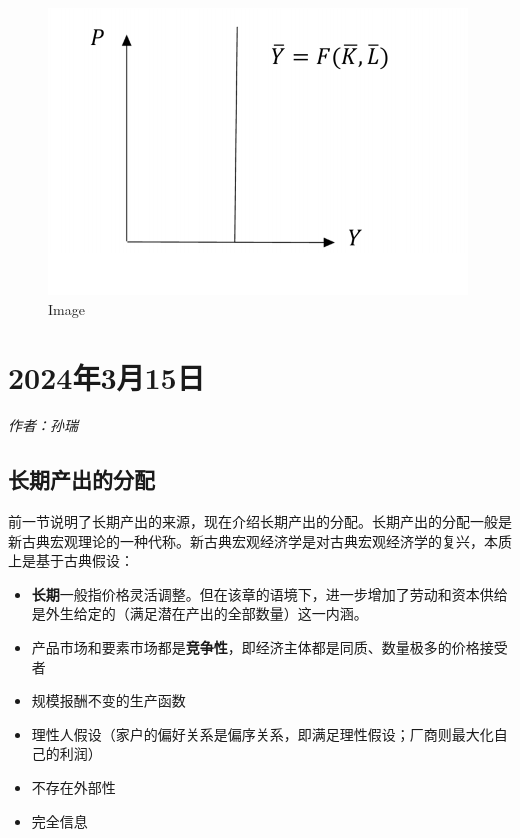 \documentclass[
  11pt,
  letterpaper,
]{ctexbook}
\begin{document}
\begin{figure}[H]

{\centering \includegraphics{figures/1-2.png}

}

\caption{Image}

\end{figure}%


\chapter{2024年3月15日}\label{ux5e743ux670815ux65e5}

\emph{作者：孙瑞}

\section{长期产出的分配}\label{ux957fux671fux4ea7ux51faux7684ux5206ux914d}

前一节说明了长期产出的来源，现在介绍长期产出的分配。长期产出的分配一般是新古典宏观理论的一种代称。新古典宏观经济学是对古典宏观经济学的复兴，本质上是基于古典假设：

\begin{itemize}
\item
  \textbf{长期}一般指价格灵活调整。但在该章的语境下，进一步增加了劳动和资本供给是外生给定的（满足潜在产出的全部数量）这一内涵。
\item
  产品市场和要素市场都是\textbf{竞争性}，即经济主体都是同质、数量极多的价格接受者
\item
  规模报酬不变的生产函数
\item
  理性人假设（家户的偏好关系是偏序关系，即满足理性假设；厂商则最大化自己的利润）
\item
  不存在外部性
\item
  完全信息
\end{itemize}
\end{document}
